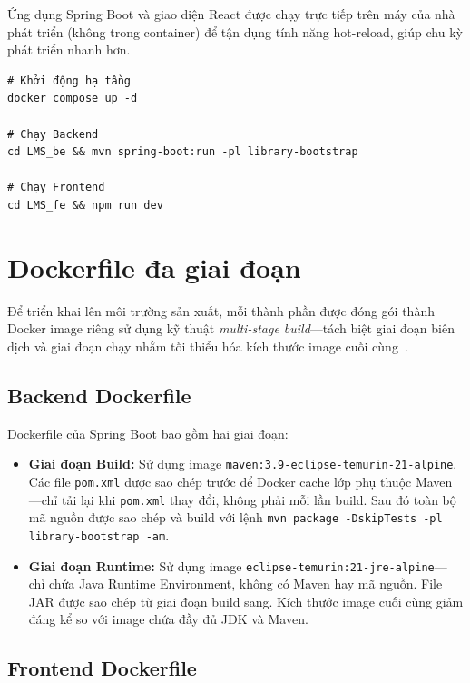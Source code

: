Ứng dụng Spring Boot và giao diện React được chạy trực tiếp trên máy của nhà
phát triển (không trong container) để tận dụng tính năng hot-reload, giúp chu
kỳ phát triển nhanh hơn.

\begin{verbatim}
# Khởi động hạ tầng
docker compose up -d

# Chạy Backend
cd LMS_be && mvn spring-boot:run -pl library-bootstrap

# Chạy Frontend
cd LMS_fe && npm run dev
\end{verbatim}

\section{Dockerfile đa giai đoạn}

Để triển khai lên môi trường sản xuất, mỗi thành phần được đóng gói thành
Docker image riêng sử dụng kỹ thuật \textit{multi-stage build}---tách biệt
giai đoạn biên dịch và giai đoạn chạy nhằm tối thiểu hóa kích thước image
cuối cùng~\cite{docker_multistage}.

\subsection{Backend Dockerfile}

Dockerfile của Spring Boot bao gồm hai giai đoạn:

\begin{itemize}
    \item \textbf{Giai đoạn Build:} Sử dụng image \texttt{maven:3.9-eclipse-temurin-21-alpine}.
          Các file \texttt{pom.xml} được sao chép trước để Docker cache lớp
          phụ thuộc Maven---chỉ tải lại khi \texttt{pom.xml} thay đổi, không
          phải mỗi lần build. Sau đó toàn bộ mã nguồn được sao chép và build
          với lệnh \texttt{mvn package -DskipTests -pl library-bootstrap -am}.

    \item \textbf{Giai đoạn Runtime:} Sử dụng image \texttt{eclipse-temurin:21-jre-alpine}---
          chỉ chứa Java Runtime Environment, không có Maven hay mã nguồn.
          File JAR được sao chép từ giai đoạn build sang. Kích thước image
          cuối cùng giảm đáng kể so với image chứa đầy đủ JDK và Maven.
\end{itemize}

\subsection{Frontend Dockerfile}

